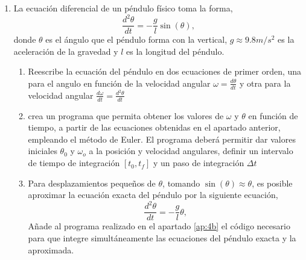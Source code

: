\begin{enumerate}
\item La ecuación diferencial de un péndulo físico toma la forma,
\begin{equation*}
\frac{d^2\theta}{dt} =-\frac{g}{l}\sin(\theta),
\end{equation*}
donde $\theta$ es el ángulo que el péndulo forma con la vertical, $g\approx9.8 m/s^2$ es la aceleración de la gravedad y $l$ es la longitud del péndulo.
\begin{enumerate}
\item Reescribe la ecuación del péndulo en dos ecuaciones de primer orden, una para el angulo en función de la velocidad angular $\omega = \frac{d\theta}{dt}$ y otra para la velocidad angular $\frac{d\omega}{dt} = \frac{d^2\theta}{dt}$

\item \label{ap:4b} crea un programa que permita obtener los valores de $\omega$ y $\theta$ en función de tiempo, a partir de las ecuaciones obtenidas en el apartado anterior, empleando el método de Euler. El programa deberá permitir dar valores iniciales $\theta_0$ y $\omega_o$ a la posición y velocidad angulares, definir un intervalo de tiempo de integración $[t_0,t_f]$ y un paso de integración $\Delta t$

\item Para desplazamientos  pequeños de $\theta$, tomando $\sin(\theta) \approx \theta$, es posible aproximar  la ecuación exacta del péndulo por la siguiente ecuación,
\begin{equation*}
\frac{d^2\theta}{dt} =-\frac{g}{l}\theta,
\end{equation*}
Añade al programa realizado en el apartado \ref{ap:4b} el código necesario para que integre simultáneamente las ecuaciones del péndulo exacta y la aproximada.


\end{enumerate}
\end{enumerate}

